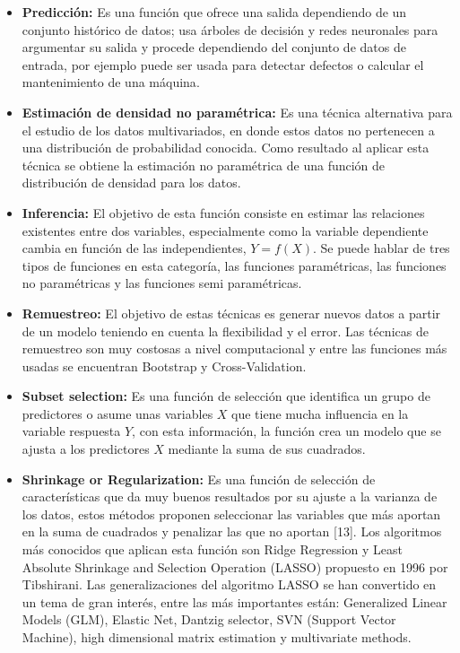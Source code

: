 \begin{itemize}
\item{ \textbf{Predicción:}}
Es una función que ofrece una salida dependiendo de un conjunto histórico de datos; usa árboles de decisión y redes neuronales para argumentar su salida y procede dependiendo del conjunto de datos de entrada, por ejemplo puede ser usada para detectar defectos o calcular el mantenimiento de una máquina\cite{Hastie2009}.
\item{ \textbf{Estimación de densidad no paramétrica:}}
Es una técnica alternativa para el estudio de los datos multivariados, en donde estos datos no pertenecen a una distribución de probabilidad conocida. Como resultado al aplicar esta técnica se obtiene la estimación no paramétrica de una función de distribución de densidad para los datos\cite{Hornick2009}.
\item{ \textbf{Inferencia:}}
El objetivo de esta función consiste en estimar las relaciones existentes entre dos variables, especialmente como la variable dependiente cambia en función de las independientes, $Y=f(X)$. Se puede hablar de tres tipos de funciones en esta categoría, las funciones paramétricas, las funciones no paramétricas y las funciones semi paramétricas\cite{Izenman2006}.
\item{ \textbf{Remuestreo:}} 
El objetivo de estas técnicas es generar nuevos datos a partir de un modelo teniendo en cuenta la flexibilidad y el error. Las técnicas de remuestreo son muy costosas a nivel computacional y entre las funciones más usadas se encuentran Bootstrap y  Cross-Validation\cite{Elovici2003}.
\item{ \textbf{Subset selection:}}
Es una función de selección que identifica un grupo de predictores o asume unas variables $X$ que tiene mucha influencia en la variable respuesta $Y$, con esta información, la función crea un modelo que se ajusta a los predictores $X$ mediante la suma de sus cuadrados\cite{Hastie2009,Izenman2006}.
\item{ \textbf{Shrinkage or Regularization:}}
Es una función de selección de características que da muy buenos resultados por su ajuste a la varianza de los datos, estos métodos proponen seleccionar las variables que más aportan en la suma de cuadrados y penalizar las que no aportan [13]. Los algoritmos más conocidos que aplican esta función son Ridge Regression y Least Absolute Shrinkage and Selection Operation (LASSO) propuesto en 1996 por Tibshirani\cite{Hastie2009}. Las generalizaciones del algoritmo LASSO se han convertido en un tema de gran interés, entre las más importantes están: Generalized Linear Models (GLM), Elastic Net, Dantzig selector, SVN (Support Vector Machine), high dimensional matrix estimation y multivariate methods.
\end{itemize}

